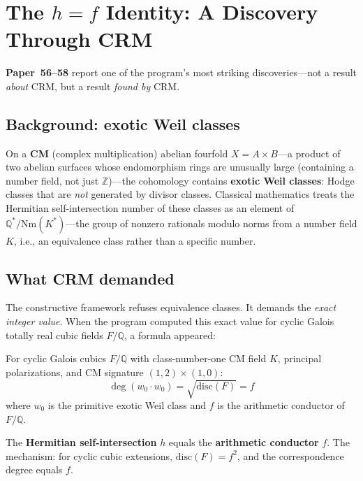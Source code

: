 \documentclass[11pt,twoside,openany]{report}
\theoremstyle{remark}
\newcommand{\paperref}[1]{\textbf{Paper~#1}}
\begin{document}
\section{The $h = f$ Identity: A Discovery Through CRM}

\paperref{56--58} report one of the program's most striking discoveries---not a result \emph{about} CRM, but a result \emph{found by} CRM.

\subsection*{Background: exotic Weil classes}

On a \textbf{CM} (complex multiplication) abelian fourfold $X = A \times B$---a product of two abelian surfaces whose endomorphism rings are unusually large (containing a number field, not just $\mathbb{Z}$)---the cohomology contains \textbf{exotic Weil classes}: Hodge classes that are \emph{not} generated by divisor classes. Classical mathematics treats the Hermitian self-intersection number of these classes as an element of $\mathbb{Q}^*/\mathrm{Nm}(K^*)$---the group of nonzero rationals modulo norms from a number field $K$, i.e., an equivalence class rather than a specific number.

\subsection*{What CRM demanded}

The constructive framework refuses equivalence classes. It demands the \emph{exact integer value}. When the program computed this exact value for cyclic Galois totally real cubic fields $F/\mathbb{Q}$, a formula appeared:

\begin{thesisbox}[The $h = f$ Identity (\paperref{56}, Theorem~A)]
For cyclic Galois cubics $F/\mathbb{Q}$ with class-number-one CM field $K$, principal polarizations, and CM signature $(1,2) \times (1,0)$:
\[
  \deg(w_0 \cdot w_0) = \sqrt{\mathrm{disc}(F)} = f
\]
where $w_0$ is the primitive exotic Weil class and $f$ is the arithmetic conductor of $F/\mathbb{Q}$.
\end{thesisbox}

The \textbf{Hermitian self-intersection} $h$ equals the \textbf{arithmetic conductor} $f$. The mechanism: for cyclic cubic extensions, $\mathrm{disc}(F) = f^2$, and the correspondence degree equals $f$.
\end{document}
